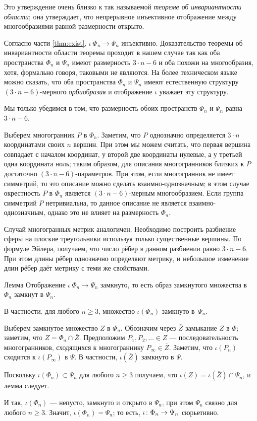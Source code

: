 \documentclass[oneside,a4paper]{article}
\begin{document}
Это утверждение очень близко к так называемой \emph{теореме об инвариантности области};
она утверждает, что непрерывное инъективное отображение между многообразиями равной размерности открыто.

Согласно части \ref{thm:exist}, $\iota\:\Phi_n\to\Psi_n$ инъективно.
Доказательство теоремы об инвариантности области теоремы проходит в нашем случае так как оба пространства $\Phi_n$ и $\Psi_n$ имеют размерность $3\cdot n-6$ и оба похожи на многообразия, хотя, формально говоря, таковыми не являются.
На более техническом языке можно сказать, что оба пространства $\Phi_n$ и $\Psi_n$ имеют естественную структуру $(3\cdot n-6)$-мерного \emph{орбиобразия} и отображение $\iota$ уважает эту структуру.

Мы только убедимся в том, что размерность обоих пространств $\Phi_n$ и $\Psi_n$ равна $3\cdot n-6$.

Выберем многогранник $P$ в $\Phi_n$.
Заметим, что $P$ однозначно определяется $3\cdot n$ координатами своих $n$ вершин.
При этом мы можем считать, что первая вершина совпадает с началом координат, у второй две координаты нулевые, а у третьей одна координата ноль; таким образом, для описания многогранников близких к $P$ достаточно $(3\cdot n-6)$-параметров.
При этом, если многогранник не имеет симметрий, то это описание можно сделать взаимно-однозначным;
в этом случае окрестность $P$ в $\Phi_n$ является $(3\cdot n-6)$-мерным многообразием.
Если группа симметрий $P$ нетривиальна,
то данное описание не является взаимно-однозначным, однако это не влияет на размерность $\Phi_n$.

Случай многогранных метрик аналогичен.
Необходимо построить разбиение сферы на плоские треугольники используя только существенные вершины.
По формуле Эйлера, получаем, что число рёбер в данном разбиении равно $3\cdot n-6$.
При этом длины рёбер однозначно определяют метрику, и небольшое изменение длин рёбер даёт метрику с теми же свойствами.


\begin{thm}{Лемма}
Отображение $\iota\:\Phi_n\to\Psi_n$ замкнуто, 
то есть образ замкнутого множества в $\Phi_n$ замкнут в $\Psi_n$.

В частности, для любого $n\ge 3$, множество $\iota(\Phi_n)$ замкнуто в~$\Psi_n$.
\end{thm}

Выберем замкнутое множество $Z$ в $\Phi_n$.
Обозначим через $\bar Z$ замыкание $Z$ в $\Phi$; заметим, что $Z=\Phi_n\cap \bar Z$.
Предположим $P_1,P_2,\dots\in Z$ --- последовательность многогранников, сходящихся к многограннику $P_\infty\in\bar Z$.
Заметим, что $\iota(P_n)$ сходится к $\iota(P_\infty)$  в $\Psi$.
В частности, $\iota(\bar Z)$ замкнуто в $\Psi$.

Поскольку $\iota(\Phi_n)\subset \Psi_n$ для любого $n\ge 3$ получаем, что  $\iota (Z)=\iota(\bar Z)\cap \Psi_n$, и лемма следует. 

\medskip

И так, $\iota(\Phi_n)$ --- непусто, замкнуто и открыто в $\Psi_n$, при этом $\Psi_n$ связно для любого $n\ge 3$.
Значит, $\iota(\Phi_n)=\Psi_n$; то есть, $\iota\:\Phi_n\z\to\Psi_n$ сюрьетивно.
\qeds

\sloppy
\printbibliography[heading=bibintoc]
\fussy
\end{document}
